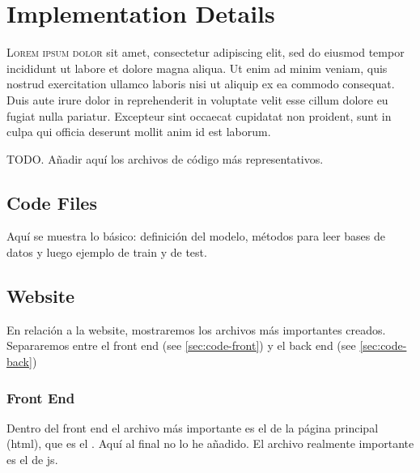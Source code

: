

\chapter{Implementation Details}\label{cha:code}



\lettrine{L}{orem ipsum dolor} sit amet, consectetur adipiscing elit, sed do
eiusmod tempor incididunt ut labore et dolore magna aliqua. Ut enim ad minim
veniam, quis nostrud exercitation ullamco laboris nisi ut aliquip ex ea commodo
consequat. Duis aute irure dolor in reprehenderit in voluptate velit esse
cillum dolore eu fugiat nulla pariatur. Excepteur sint occaecat cupidatat non
proident, sunt in culpa qui officia deserunt mollit anim id est laborum.

TODO. Añadir aquí los archivos de código más representativos.


\section{Code Files}

Aquí se muestra lo básico: definición del modelo, métodos para leer bases de
datos y luego ejemplo de train y de test.







\section{Website}

En relación a la website, mostraremos los archivos más importantes
creados. Separaremos entre el front end (see \vref{sec:code-front}) y el back
end (see \vref{sec:code-back})

\subsection{Front End}\label{sec:code-front}

Dentro del front end el archivo más importante es el de la página principal
(\acs{html}), que es el . Aquí al final no lo he añadido. El
archivo realmente importante es el de js.

